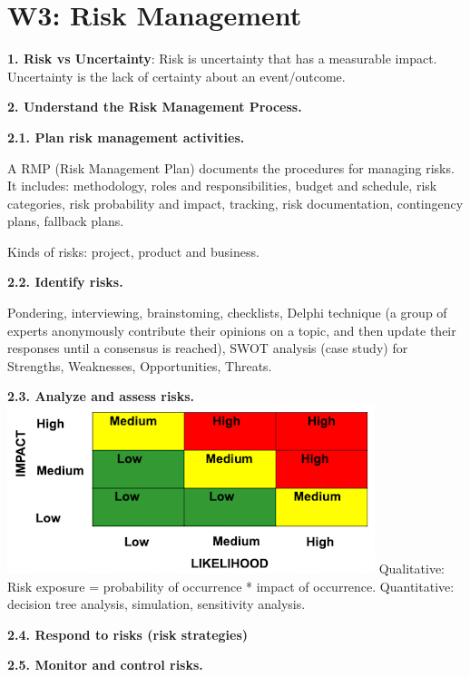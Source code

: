 \section{W3: Risk Management}

\textbf{1. Risk vs Uncertainty}: Risk is uncertainty that has a measurable impact. Uncertainty is the lack of certainty about an event/outcome.

\textbf{2. Understand the Risk Management Process.}

    \textbf{2.1. Plan risk management activities.}

    A RMP (Risk Management Plan) documents the procedures for managing risks. It includes: methodology, roles and responsibilities, budget and schedule, risk categories, risk probability and impact, tracking, risk documentation, contingency plans, fallback plans.

    Kinds of risks: project, product and business.

    \textbf{2.2. Identify risks.}

    Pondering, interviewing, brainstoming, checklists, Delphi technique (a group of experts anonymously contribute their opinions on a topic, and then update their responses until a consensus is reached), SWOT analysis (case study) for Strengths, Weaknesses, Opportunities, Threats.

    \textbf{2.3. Analyze and assess risks.}
    \includegraphics[width=\linewidth]{figs/SCR-20240605-sqml.png}
    Qualitative: Risk exposure = probability of occurrence * impact of occurrence.
    Quantitative: decision tree analysis, simulation, sensitivity analysis.


    \textbf{2.4. Respond to risks (risk strategies)}


    \textbf{2.5. Monitor and control risks.}
